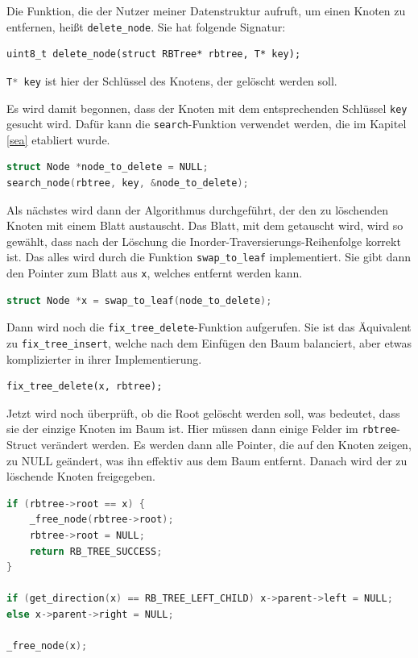 \documentclass[11pt]{article}
\newcommand{\lstin}[1]{\lstinline[language=C]{#1}}
\begin{document}
Die Funktion, die der Nutzer meiner Datenstruktur aufruft, um einen Knoten zu entfernen, heißt \lstin{delete_node}.
Sie hat folgende Signatur:

\begin{lstlisting}
uint8_t delete_node(struct RBTree* rbtree, T* key);
\end{lstlisting}

\lstin{T* key} ist hier der Schlüssel des Knotens, der gelöscht werden soll.

Es wird damit begonnen, dass der Knoten mit dem entsprechenden Schlüssel \lstin{key} gesucht wird.
Dafür kann die \lstin{search}-Funktion verwendet werden, die im Kapitel \ref{sea} etabliert wurde.

\begin{lstlisting}[language=C]
struct Node *node_to_delete = NULL;
search_node(rbtree, key, &node_to_delete);
\end{lstlisting}

Als nächstes wird dann der Algorithmus durchgeführt, der den zu löschenden Knoten mit einem Blatt austauscht.
Das Blatt, mit dem getauscht wird, wird so gewählt, dass nach der Löschung die Inorder-Traversierungs-Reihenfolge korrekt ist.
Das alles wird durch die Funktion \lstin{swap_to_leaf} implementiert. Sie gibt dann den Pointer zum Blatt aus \lstin{x}, welches entfernt werden kann.
\begin{lstlisting}[language=C]
struct Node *x = swap_to_leaf(node_to_delete);
\end{lstlisting}

Dann wird noch die \lstin{fix_tree_delete}-Funktion aufgerufen.
Sie ist das Äquivalent zu \lstin{fix_tree_insert}, welche nach dem Einfügen den Baum balanciert,
aber etwas komplizierter in ihrer Implementierung.

\begin{lstlisting}
fix_tree_delete(x, rbtree);
\end{lstlisting}

Jetzt wird noch überprüft, ob die Root gelöscht werden soll, was bedeutet,
dass sie der einzige Knoten im Baum ist. Hier müssen dann einige Felder im \lstin{rbtree}-Struct
verändert werden. Es werden dann alle Pointer, die auf den Knoten zeigen, zu NULL geändert,
was ihn effektiv aus dem Baum entfernt. Danach wird der zu löschende Knoten freigegeben.

\begin{lstlisting}[language=C]
if (rbtree->root == x) {
    _free_node(rbtree->root);
    rbtree->root = NULL;
    return RB_TREE_SUCCESS;
}

if (get_direction(x) == RB_TREE_LEFT_CHILD) x->parent->left = NULL;
else x->parent->right = NULL;

_free_node(x);
\end{lstlisting}
\end{document}
